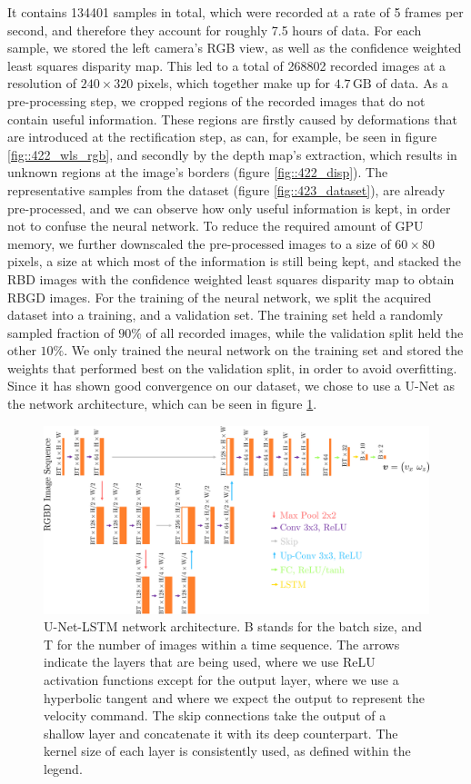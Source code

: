 It contains 134401 samples in total, which were recorded at a rate of 5 frames per second, and therefore they account for roughly 7.5 hours of data. For each sample, we stored the left camera's RGB view, as well as the confidence weighted least squares disparity map. This led to a total of 268802 recorded images at a resolution of $240\times320$ pixels, which together make up for $4.7\,\text{GB}$ of data. As a pre-processing step, we cropped regions of the recorded images that do not contain useful information. These regions are firstly caused by deformations that are introduced at the rectification step, as can, for example, be seen in figure \ref{fig::422_wls_rgb}, and secondly by the depth map's extraction, which results in unknown regions at the image's borders (figure \ref{fig::422_disp}). The representative samples from the dataset (figure \ref{fig::423_dataset}), are already pre-processed, and we can observe how only useful information is kept, in order not to confuse the neural network. To reduce the required amount of GPU memory, we further downscaled the pre-processed images to a size of $60\times80$ pixels, a size at which most of the information is still being kept, and stacked the RBD images with the confidence weighted least squares disparity map to obtain RBGD images. For the training of the neural network, we split the acquired dataset into a training, and a validation set. The training set held a randomly sampled fraction of $90\%$ of all recorded images, while the validation split held the other $10\%$. We only trained the neural network on the training set and stored the weights that performed best on the validation split, in order to avoid overfitting. Since it has shown good convergence on our dataset, we chose to use a U-Net \cite{ronneberger2015u} as the network architecture, which can be seen in figure \ref{fig::423_unet}.
\begin{figure}[h!]
	\centering
	\includegraphics[scale=.5]{chapters/11_autonomous_walking_experiments/img/unet.png}
	\caption{U-Net-LSTM network architecture. B stands for the batch size, and T for the number of images within a time sequence. The arrows indicate the layers that are being used, where we use ReLU activation functions except for the output layer, where we use a hyperbolic tangent and where we expect the output to represent the velocity command. The skip connections take the output of a shallow layer and concatenate it with its deep counterpart. The kernel size of each layer is consistently used, as defined within the legend.}
	\label{fig::423_unet}
\end{figure}
